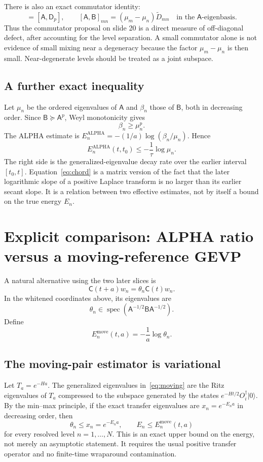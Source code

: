 \documentclass[11pt]{article}
\newcommand{\C}{\mathsf C}
\newcommand{\A}{\mathsf A}
\newcommand{\B}{\mathsf B}
\newcommand{\D}{\mathsf D}
\newcommand{\Ealp}{E^{\mathrm{ALPHA}}}
\newcommand{\Emov}{E^{\mathrm{move}}}
\newcommand{\spec}{\operatorname{spec}}
\begin{document}
There is also an exact commutator identity:
\begin{equation}
[\A,\B]=[\A,\D_p],\qquad
[\A,\B]_{mn}=(\mu_m-\mu_n)\widetilde D_{mn}
\quad\text{in the $\A$-eigenbasis}.
\label{eq:comm}
\end{equation}
Thus the commutator proposal on slide 20 is a direct measure of off-diagonal defect, after accounting for the level separation. A small commutator alone is not evidence of small mixing near a degeneracy because the factor $\mu_m-\mu_n$ is then small. Near-degenerate levels should be treated as a joint subspace.

\subsection{A further exact inequality}
Let $\mu_n$ be the ordered eigenvalues of $\A$ and $\beta_n$ those of $\B$, both in decreasing order. Since $\B\succeq\A^p$, Weyl monotonicity gives
\[
\beta_n\geq\mu_n^p.
\]
The ALPHA estimate is $\Ealp_n=-(1/a)\log(\beta_n/\mu_n)$. Hence
\begin{equation}
\boxed{
\Ealp_n(t,t_0)\leq -\frac1\tau\log\mu_n.
}
\label{eq:chord}
\end{equation}
The right side is the generalized-eigenvalue decay rate over the earlier interval $[t_0,t]$. Equation~\eqref{eq:chord} is a matrix version of the fact that the later logarithmic slope of a positive Laplace transform is no larger than its earlier secant slope. It is a relation between two effective estimates, not by itself a bound on the true energy $E_n$.

\section{Explicit comparison: ALPHA ratio versus a moving-reference GEVP}
A natural alternative using the two later slices is
\begin{equation}
\C(t+a)w_n=\theta_n\C(t)w_n.
\label{eq:moving}
\end{equation}
In the whitened coordinates above, its eigenvalues are
\[
\theta_n\in\spec(\A^{-1/2}\B\A^{-1/2}).
\]
Define
\[
\Emov_n(t,a)=-\frac1a\log\theta_n.
\]

\subsection{The moving-pair estimator is variational}
Let $T_a=e^{-Ha}$. The generalized eigenvalues in~\eqref{eq:moving} are the Ritz eigenvalues of $T_a$ compressed to the subspace generated by the states $e^{-Ht/2}O_i^\dagger|0\rangle$. By the min--max principle, if the exact transfer eigenvalues are $x_n=e^{-E_na}$ in decreasing order, then
\begin{equation}
\theta_n\leq x_n=e^{-E_na},\qquad
\boxed{E_n\leq\Emov_n(t,a)}
\label{eq:ritz}
\end{equation}
for every resolved level $n=1,\ldots,N$. This is an exact upper bound on the energy, not merely an asymptotic statement. It requires the usual positive transfer operator and no finite-time wraparound contamination.
\end{document}
